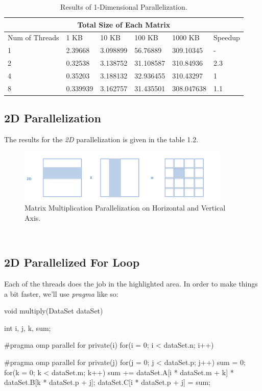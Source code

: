 \documentclass[12pt]{article}
\numberwithin{equation}{section}
\numberwithin{table}{section}
\numberwithin{figure}{section}
\begin{document}
\def\arraystretch{1.3}
\begin{table}[!h]
		\centering
\begin{tabular}{ |p{3cm}||p{2cm}|p{2cm}|p{2cm}|p{2cm}|p{1.5cm}|  }
	
	\hline
	\multicolumn{6}{|c|}{Total Size of Each Matrix} \\
	\hline
	 Num of Threads & 1 KB & 10 KB & 100 KB & 1000 KB & Speedup\\
	\hline
		1   & 2.39668    &3.098899 &   56.76889 &   309.10345&   -\\
		2   & 0.32538    &3.138752  &  31.108587 &   310.84936 &   2.3\\
		4   & 0.35203    &3.188132 &   32.936455 &   310.43297&   1\\
		8   & 0.339939    &3.162757&   31.435501 &   308.047638&   1.1\\
	\hline
\end{tabular}
	\caption{Results of 1-Dimensional Parallelization.}
\label{figsolplot}
\end{table}
\newpage
\subsection{2D Parallelization}
The results for the \textit{2D} parallelization is given in the table 1.2.
\begin{figure}[!h]\centering
	\includegraphics[width=0.9\textwidth]{two_dimensional.png}
	\caption{Matrix Multiplication Parallelization on Horizontal and Vertical Axis.}
	\label{figsolplot}
\end{figure}\\
\subsection{2D Parallelized For Loop}
Each of the threads does the job in the highlighted area.
In order to make things a bit faster, we'll use \textit{pragma} like so:
\begin{cpp}
		void multiply(DataSet dataSet){
			int i, j, k, sum;
			
			#pragma omp parallel for private(i)
			for(i = 0; i < dataSet.n; i++){
				
				#pragma omp parallel for private(j)
				for(j = 0; j < dataSet.p; j++){
					sum = 0;
					for(k = 0; k < dataSet.m; k++){
						sum += dataSet.A[i * dataSet.m + k] * dataSet.B[k * dataSet.p + j];
					}
					dataSet.C[i * dataSet.p + j] = sum;
				}
			}
		}
\end{cpp}
\end{document}
